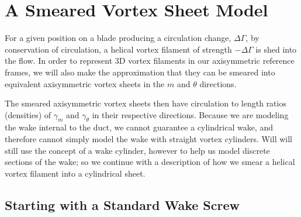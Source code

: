 

\section{A Smeared Vortex Sheet Model}
\label{sec:wakevorticity}

For a given position on a blade producing a circulation change,  \(\Delta \Gamma\), by conservation of circulation, a helical vortex filament of strength \(-\Delta \Gamma\) is shed into the flow.
%
In order to represent 3D vortex filaments in our axisymmetric reference frames, we will also make the approximation that they can be smeared into equivalent axisymmetric vortex sheets in the \(m\) and \(\theta\) directions.
%
\begin{assumption}




\end{assumption}
%
The smeared axisymmetric vortex sheets then have circulation to length ratios (densities) of \(\gamma_m\) and \(\gamma_\theta\) in their respective directions.
%
Because we are modeling the wake internal to the duct, we cannot guarantee a cylindrical wake, and therefore cannot simply model the wake with straight vortex cylinders.
%
Will will still use the concept of a wake cylinder, however to help us model discrete sections of the wake; so we continue with a description of how we smear a helical vortex filament into a cylindrical sheet.

\subsection{Starting with a Standard Wake Screw}
\label{ssec:wakescrew}



